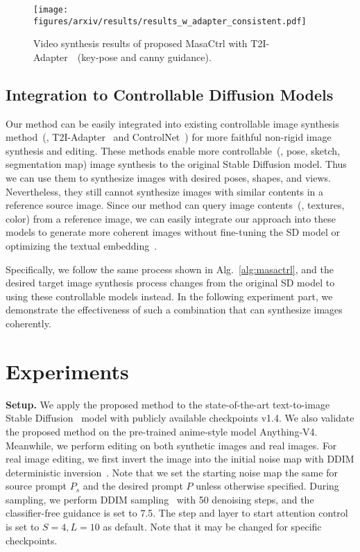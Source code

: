 \documentclass[10pt,twocolumn,letterpaper]{article}
\begin{document}
\begin{figure*}
    \centering
    \texttt{[image: figures/arxiv/results/results\_w\_adapter\_consistent.pdf]}
    \caption{Video synthesis results of proposed MasaCtrl with T2I-Adapter~\cite{mou2023t2i}~(key-pose and canny guidance). }
    \label{fig:coherent_synthesis_adapter}
\end{figure*}

\subsection{Integration to Controllable Diffusion Models} \label{sec:controllable}

Our method can be easily integrated into existing controllable image synthesis method~(\eg, T2I-Adapter~\cite{mou2023t2i} and ControlNet~\cite{zhang2023adding}) for more faithful non-rigid image synthesis and editing.
These methods enable more controllable~(\eg, pose, sketch, segmentation map) image synthesis to the original Stable Diffusion model. Thus we can use them to synthesize images with desired poses, shapes, and views. Nevertheless, they still cannot synthesize images with similar contents in a reference source image. Since our method can query image contents~(\eg, textures, color) from a reference image, we can easily integrate our approach into these models to generate more coherent images without fine-tuning the SD model or optimizing the textual embedding~\cite{kawar2022imagic}. 

Specifically, we follow the same process shown in Alg.~\ref{alg:masactrl}, and the desired target image synthesis process changes from the original SD model to using these controllable models instead. In the following experiment part, we demonstrate the effectiveness of such a combination that can synthesize images coherently.


\section{Experiments}
\noindent\textbf{Setup.}
We apply the proposed method to the state-of-the-art text-to-image Stable Diffusion~\cite{rombach2022high} model with publicly available checkpoints v1.4. We also validate the proposed method on the pre-trained anime-style model Anything-V4. Meanwhile, we perform editing on both synthetic images and real images. For real image editing, we first invert the image into  the initial noise map with DDIM deterministic inversion~\cite{song2020denoising}. Note that we set the starting noise map the same for source prompt $P_s$ and the desired prompt $P$ unless otherwise specified. During sampling, we perform DDIM sampling~\cite{song2020denoising} with 50 denoising steps, and the classifier-free guidance is set to 7.5. The step and layer to start attention control is set to $S=4, L=10$ as default. Note that it may be changed for specific checkpoints.
\end{document}
